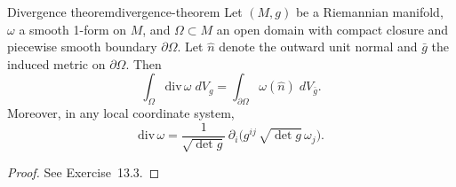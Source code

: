 \begin{colorlem}{Divergence theorem}{divergence-theorem}
Let $(M, g)$ be a Riemannian manifold, $\omega$ a smooth 1-form on $M$, and $\Omega \subset M$ an open domain with compact closure and piecewise smooth boundary $\partial\Omega$. Let $\hat n$ denote the outward unit normal and $\bar g$ the induced metric on $\partial\Omega$. Then
\begin{equation}
    \label{eq:divergence-theorem}
    \int_\Omega \mathrm{div}\, \omega\; dV_g = \int_{\partial\Omega} \omega(\hat n)\; dV_{\bar g}.
\end{equation}
Moreover, in any local coordinate system,
\[
\mathrm{div}\, \omega = \frac{1}{\sqrt{\det g}}\, \partial_i\!\big(g^{ij}\, \sqrt{\det g}\, \omega_j\big).
\]
\end{colorlem}

\begin{proof}
See Exercise~13.3.
\end{proof}